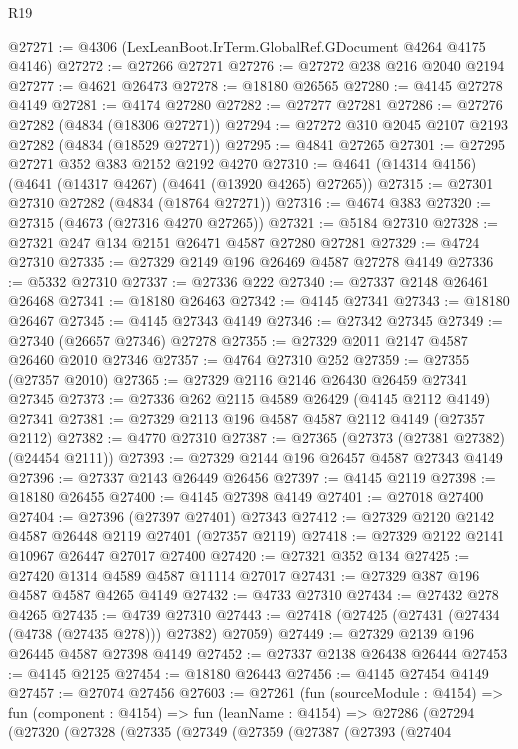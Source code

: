 \begin{lexlean}{R19}
\begin{coremodule}
@27271 := @4306 (LexLeanBoot.IrTerm.GlobalRef.GDocument @4264 @4175 @4146)
@27272 := @27266 @27271
@27276 := @27272 @238 @216 @2040 @2194
@27277 := @4621 @26473
@27278 := @18180 @26565
@27280 := @4145 @27278 @4149
@27281 := @4174 @27280
@27282 := @27277 @27281
@27286 := @27276 @27282 (@4834 (@18306 @27271))
@27294 := @27272 @310 @2045 @2107 @2193 @27282 (@4834 (@18529 @27271))
@27295 := @4841 @27265
@27301 := @27295 @27271 @352 @383 @2152 @2192 @4270
@27310 := @4641 (@14314 @4156) (@4641 (@14317 @4267) (@4641 (@13920 @4265) @27265))
@27315 := @27301 @27310 @27282 (@4834 (@18764 @27271))
@27316 := @4674 @383
@27320 := @27315 (@4673 (@27316 @4270 @27265))
@27321 := @5184 @27310
@27328 := @27321 @247 @134 @2151 @26471 @4587 @27280 @27281
@27329 := @4724 @27310
@27335 := @27329 @2149 @196 @26469 @4587 @27278 @4149
@27336 := @5332 @27310
@27337 := @27336 @222
@27340 := @27337 @2148 @26461 @26468
@27341 := @18180 @26463
@27342 := @4145 @27341
@27343 := @18180 @26467
@27345 := @4145 @27343 @4149
@27346 := @27342 @27345
@27349 := @27340 (@26657 @27346) @27278
@27355 := @27329 @2011 @2147 @4587 @26460 @2010 @27346
@27357 := @4764 @27310 @252
@27359 := @27355 (@27357 @2010)
@27365 := @27329 @2116 @2146 @26430 @26459 @27341 @27345
@27373 := @27336 @262 @2115 @4589 @26429 (@4145 @2112 @4149) @27341
@27381 := @27329 @2113 @196 @4587 @4587 @2112 @4149 (@27357 @2112)
@27382 := @4770 @27310
@27387 := @27365 (@27373 (@27381 @27382) (@24454 @2111))
@27393 := @27329 @2144 @196 @26457 @4587 @27343 @4149
@27396 := @27337 @2143 @26449 @26456
@27397 := @4145 @2119
@27398 := @18180 @26455
@27400 := @4145 @27398 @4149
@27401 := @27018 @27400
@27404 := @27396 (@27397 @27401) @27343
@27412 := @27329 @2120 @2142 @4587 @26448 @2119 @27401 (@27357 @2119)
@27418 := @27329 @2122 @2141 @10967 @26447 @27017 @27400
@27420 := @27321 @352 @134
@27425 := @27420 @1314 @4589 @4587 @11114 @27017
@27431 := @27329 @387 @196 @4587 @4587 @4265 @4149
@27432 := @4733 @27310
@27434 := @27432 @278 @4265
@27435 := @4739 @27310
@27443 := @27418 (@27425 (@27431 (@27434 (@4738 (@27435 @278))) @27382) @27059)
@27449 := @27329 @2139 @196 @26445 @4587 @27398 @4149
@27452 := @27337 @2138 @26438 @26444
@27453 := @4145 @2125
@27454 := @18180 @26443
@27456 := @4145 @27454 @4149
@27457 := @27074 @27456
@27603 := @27261
    (fun (sourceModule : @4154) =>
    fun (component : @4154) =>
    fun (leanName : @4154) =>
    @27286
      (@27294
        (@27320
          (@27328
            (@27335
              (@27349
                (@27359
                  (@27387
                    (@27393
                      (@27404

\end{coremodule}
\end{lexlean}
